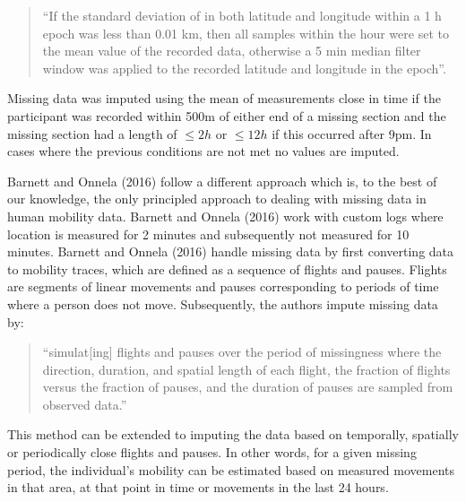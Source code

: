 \documentclass[man]{apa6}
\theoremstyle{definition}
\theoremstyle{definition}
\theoremstyle{definition}
\theoremstyle{remark}
\begin{document}
\begin{quote}
\enquote{If the standard deviation of in both latitude and longitude
within a 1 h epoch was less than 0.01 km, then all samples within the
hour were set to the mean value of the recorded data, otherwise a 5 min
median filter window was applied to the recorded latitude and longitude
in the epoch}.
\end{quote}

Missing data was imputed using the mean of measurements close in time if
the participant was recorded within 500m of either end of a missing
section and the missing section had a length of \(\leq 2h\) or
\(\leq 12h\) if this occurred after 9pm. In cases where the previous
conditions are not met no values are imputed.

Barnett and Onnela (2016) follow a different approach which is, to the
best of our knowledge, the only principled approach to dealing with
missing data in human mobility data. Barnett and Onnela (2016) work with
custom logs where location is measured for 2 minutes and subsequently
not measured for 10 minutes. Barnett and Onnela (2016) handle missing
data by first converting data to mobility traces, which are defined as a
sequence of flights and pauses. Flights are segments of linear movements
and pauses corresponding to periods of time where a person does not
move. Subsequently, the authors impute missing data by:

\begin{quote}
\enquote{simulat{[}ing{]} flights and pauses over the period of
missingness where the direction, duration, and spatial length of each
flight, the fraction of flights versus the fraction of pauses, and the
duration of pauses are sampled from observed data.}
\end{quote}

This method can be extended to imputing the data based on temporally,
spatially or periodically close flights and pauses. In other words, for
a given missing period, the individual's mobility can be estimated based
on measured movements in that area, at that point in time or movements
in the last 24 hours.
\end{document}
